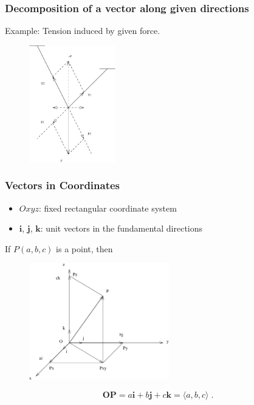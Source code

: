 \begin{frame}
  \frametitle{Decomposition of a vector along given directions}

  Example: Tension induced by given force.

\begin{figure}[h]
  \includegraphics[height=2in]{../images/ok-tension.eps}
  \label{fig:tension}
\end{figure}


\end{frame}

\begin{frame}
 \frametitle{Vectors in Coordinates}

  \begin{itemize}
    \item $Oxyz$: fixed rectangular coordinate system
    \item $\textbf{i}$, $\textbf{j}$, $\textbf{k}$: unit vectors in the fundamental directions
  \end{itemize}

If $P(a,b,c)$ is a point, then
\begin{figure}[h]
  \includegraphics[height=2in]{../images/ok-vector_decomposition.eps}
\end{figure}
%
$$\textbf{OP} = a\textbf{i}+b\textbf{j}+c\textbf{k} = \langle a, b, c\rangle\; .$$

\end{frame}

